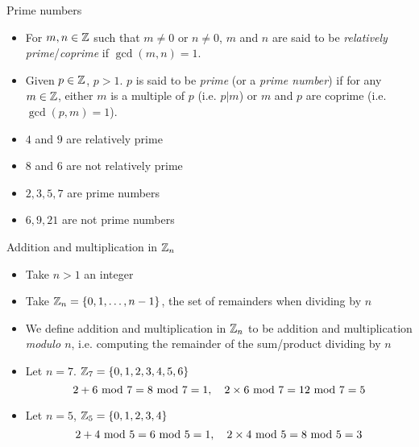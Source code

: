 \begin{frame}{Prime numbers}
    \begin{definition}
\begin{itemize}
    \item For $m,n\in{\mathbb Z}$ such that $m\neq0$ or $n\neq0$, $m$ and $n$ are said to be \textit{relatively prime}/\textit{coprime} if $\gcd(m,n)=1$.
    \item Given $p\in{\mathbb Z}$, $p>1$.
    $p$ is said to be \textit{prime} (or a \textit{prime number}) if for any $m\in{\mathbb Z}$, either $m$ is a multiple of $p$ (i.e. $p|m$) or $m$ and $p$ are coprime (i.e. $\gcd(p,m)=1$).
\end{itemize}
\end{definition}
\begin{example}
\begin{itemize}
    \item $4$ and $9$ are relatively prime
    \item $8$ and $6$ are not relatively prime
    \item $2,3,5,7$ are prime numbers
    \item $6,9,21$ are not prime numbers
\end{itemize}
\end{example}
\end{frame}

\begin{frame}{Addition and multiplication in ${\mathbb Z}_n$}
\begin{itemize}
    \item Take $n>1$ an integer
    \item Take ${\mathbb Z}_n=\{0,1,\dots,n-1\}$, the set of remainders when dividing by $n$
    \item We define addition and multiplication in ${\mathbb Z}_n$ to be addition and multiplication \textit{modulo $n$}, i.e. computing the remainder of the sum/product dividing by $n$
\end{itemize}
\begin{example}
    \begin{itemize}
        \item Let $n=7$. ${\mathbb Z}_7=\{0,1,2,3,4,5,6\}$
        \[
        2+6\textrm{~mod~}7=8\textrm{~mod~}7=1,\quad 2\times6\textrm{~mod~}7=12\textrm{~mod~}7=5
        \]
        \item Let $n=5$, ${\mathbb Z}_5=\{0,1,2,3,4\}$
        \[
        2+4\textrm{~mod~}5=6\textrm{~mod~}5=1,\quad 2\times4\textrm{~mod~}5=8\textrm{~mod~}5=3
        \]
    \end{itemize}
\end{example}
\end{frame}


